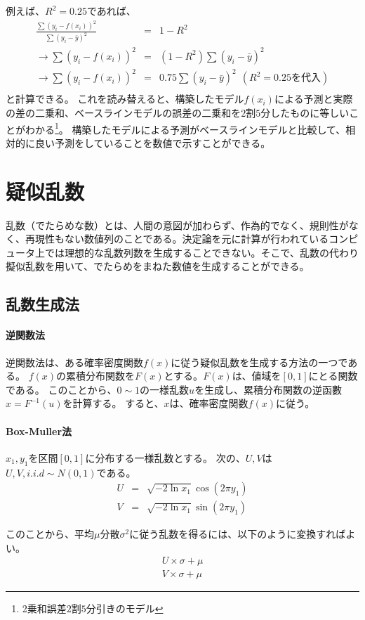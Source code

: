 例えば、$R^2=0.25$であれば、
\begin{eqnarray*}
 \frac{\sum (y_i-f(x_i))^2}{\sum (y_i-\bar{y})^2} &=& 1-R^2 \\
 \rightarrow \sum (y_i-f(x_i))^2 &=& (1-R^2)\sum (y_i-\bar{y})^2 \\
 \rightarrow \sum (y_i-f(x_i))^2 &=& 0.75\sum (y_i-\bar{y})^2 \ \ (R^2 = 0.25を代入) \\
\end{eqnarray*}
と計算できる。
これを読み替えると、構築したモデル$f(x_i)$による予測と実際の差の二乗和、ベースラインモデルの誤差の二乗和を$2$割$5$分したものに等しいことがわかる\footnote{2乗和誤差$2$割$5$分引きのモデル}。
構築したモデルによる予測がベースラインモデルと比較して、相対的に良い予測をしていることを数値で示すことができる。


\section{疑似乱数}
乱数（でたらめな数）とは、人間の意図が加わらず、作為的でなく、規則性がなく、再現性もない数値列のことである。決定論を元に計算が行われているコンピュータ上では理想的な乱数列数を生成することできない。そこで、乱数の代わり擬似乱数を用いて、でたらめをまねた数値を生成することができる。

\subsection{乱数生成法}
\paragraph{逆関数法}
逆関数法は、ある確率密度関数$f(x)$に従う疑似乱数を生成する方法の一つである。
$f(x)$の累積分布関数を$F(x)$とする。$F(x)$は、値域を$[0,1]$にとる関数である。
このことから、$0\sim 1$の一様乱数$u$を生成し、累積分布関数の逆函數$x=F^{-1}(u)$を計算する。
すると、$x$は、確率密度関数$f(x)$に従う。

\paragraph{Box-Muller法}
$x_1,y_1$を区間$[0,1]$に分布する一様乱数とする。
次の、$U,V$は$U,V,i.i.d\sim N(0,1)$である。
\begin{eqnarray*}
 U &=& \sqrt{-2\ln x_1}\cos(2\pi y_1) \\
 V &=& \sqrt{-2\ln x_1}\sin(2\pi y_1)
\end{eqnarray*}

このことから、平均$\mu$分散$\sigma^2$に従う乱数を得るには、以下のように変換すればよい。
\begin{eqnarray*}
 U\times \sigma+\mu \\
  V\times \sigma+\mu
\end{eqnarray*}

